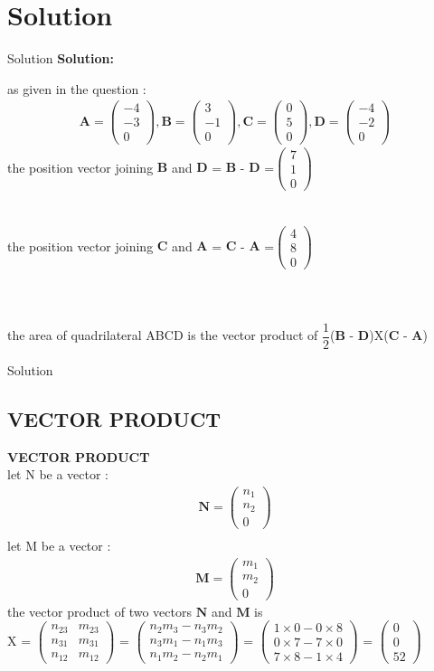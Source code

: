 \documentclass{beamer}
\let\vec\mathbf
\theoremstyle{remark}
\newcommand{\myvec}[1]{\ensuremath{\begin{pmatrix}#1\end{pmatrix}}}
\numberwithin{equation}{section}
\begin{document}
\section{Solution}
\begin{frame}{Solution}
\textbf{Solution:} 

as given in the question :
\begin{align*}
     \vec{A}=\myvec{-4\\-3\\0},
     \vec{B}=\myvec{3\\-1\\0},
     \vec{C}=\myvec{0\\5\\0},
     \vec{D}=\myvec{-4\\-2\\0}
\end{align*}
the position vector joining $\vec{B}$ and $\vec{D}$ =  $\vec{B}$ -  $\vec{D}$ =$\myvec{7\\1\\0}$ 
\\
\\
\\
the position vector joining $\vec{C}$ and $\vec{A}$ =  $\vec{C}$ -  $\vec{A}$ =$\myvec{4\\8\\0}$
\\
\\
\\
\\
the area of quadrilateral ABCD is the vector  product of $\dfrac{1}{2}$($\vec{B}$ -  $\vec{D}$)X($\vec{C}$ -  $\vec{A}$)
\\  
\end{frame}
\begin{frame}{Solution}
\subsection{VECTOR PRODUCT }
\textbf{VECTOR PRODUCT}
\\
let N be a vector :
\begin{align}
    \vec{N}=\myvec{n_1\\n_2\\0}
    \\
    \end{align}
    let M be a vector :
    \begin{align}
    \vec{M}=\myvec{m_1\\m_2\\0}
\end{align}
the vector product of two vectors $\vec{N}$ and $\vec{M}$ is 
\\
\vec{N}X\vec{M} =
\myvec{
n_{23} & m_{23} \\
n_{31} & m_{31} \\
n_{12} & m_{12}
}
=
\myvec{
n_2 m_3 - n_3 m_2 \\
n_3 m_1 - n_1 m_3 \\
n_1 m_2 - n_2 m_1
}
=
\myvec{
1 \times 0 - 0 \times 8 \\
0 \times 7 - 7 \times 0 \\
7 \times 8 - 1 \times 4
}
=
\myvec{
0 \\
0 \\
52
}
\end{frame}
\end{document}
